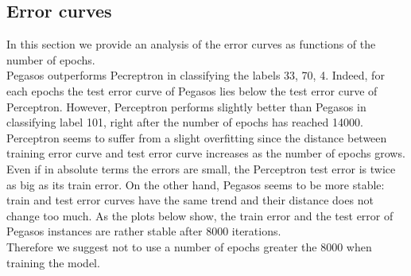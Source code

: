 \documentclass{article}
\begin{document}
\subsection{Error curves}
In this section we provide an analysis of the error curves as functions of the number of epochs.\\
Pegasos outperforms Pecreptron in classifying the labels 33, 70, 4. Indeed, for each epochs the test error curve of Pegasos lies below the test error curve of Perceptron. However, Perceptron performs slightly better than Pegasos in classifying label 101, right after the number of epochs has reached 14000. \\
Perceptron seems to suffer from a slight overfitting since the distance between training error curve and test error curve increases as the number of epochs grows. Even if in absolute terms the errors are small, the Perceptron test error is twice as big as its train error. On the other hand, Pegasos seems to be more stable: train and test error curves have the same trend and their distance does not change too much.
As the plots below show, the train error and the test error of Pegasos instances are rather stable after 8000 iterations.
\\ Therefore we suggest not to use a number of epochs greater the 8000 when training the model.
\end{document}
